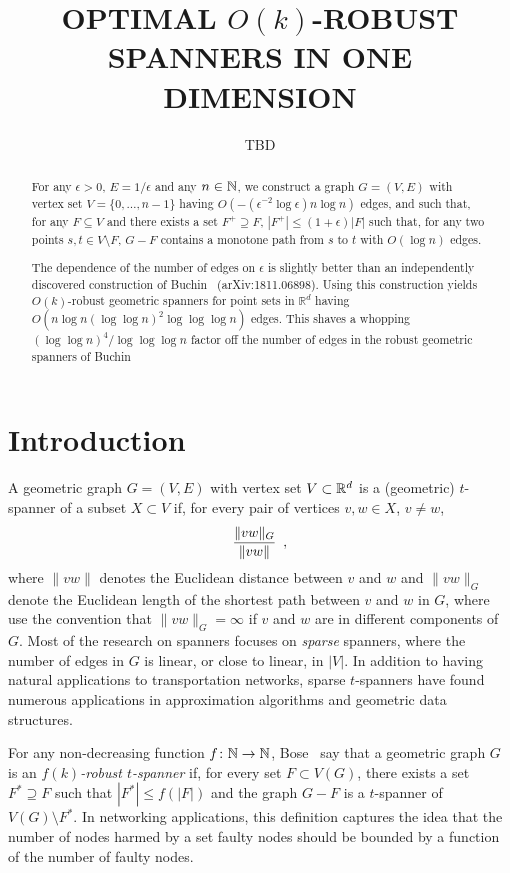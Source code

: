 \documentclass{patmorin}
\title{\MakeUppercase{Optimal} $O(k)$-\MakeUppercase{Robust Spanners in One Dimension}}
\author{TBD}
\begin{document}
\maketitle


\begin{abstract}
  For any $\epsilon >0$, $E=1/\epsilon$ and any $n\in\mathbb{N}$, we construct
  a graph $G=(V,E)$ with vertex set $V=\{0,\ldots,n-1\}$ having
  $O(-(\epsilon^{-2}\log\epsilon) n\log n)$ edges, and such that, for
  any $F\subseteq V$ and there exists a set $F^+\supseteq F$, $|F^+|\le
  (1+\epsilon)|F|$ such that, for any two points $s,t\in V\setminus F$,
  $G-F$ contains a monotone path from $s$ to $t$ with $O(\log n)$ edges.

  The dependence of the number of edges on $\epsilon$ is slightly
  better than an independently discovered construction of Buchin \etal\
  (arXiv:1811.06898). Using this construction yields $O(k)$-robust
  geometric spanners for point sets in $\mathbb{R}^d$ having $O(n\log
  n(\log\log n)^2\log\log\log n)$ edges. This shaves a whopping $(\log\log
  n)^4/\log\log\log n$ factor off the number of edges in the robust
  geometric spanners of Buchin \etal
\end{abstract}

\section{Introduction}

A geometric graph $G=(V,E)$ with vertex set $V\subset\mathbb{R}^d$ is a (geometric)
$t$-spanner of a subset $X\subset V$ if, for every pair of vertices
$v,w\in X$, $v\neq w$,
\begin{equation}
  \frac{\|vw\|_G}{\|vw\|} \enspace , \eqlabel{spanning-ratio}
\end{equation}
where $\|vw\|$ denotes the Euclidean distance between $v$ and $w$ and
$\|vw\|_G$ denote the Euclidean length of the shortest path between $v$
and $w$ in $G$, where use the convention that $\|vw\|_G=\infty$ if $v$
and $w$ are in different components of $G$.  
Most of the research on spanners focuses on \emph{sparse}
spanners, where the number of edges in $G$ is linear, or close to linear,
in $|V|$.  In addition to having natural applications to transportation
networks, sparse $t$-spanners have found numerous applications in
approximation algorithms and geometric data structures.

For any non-decreasing function $f\colon\mathbb{N}\to\mathbb{N}$, Bose \etal\ say
that a geometric graph $G$ is an \emph{$f(k)$-robust $t$-spanner}
if, for every set $F\subset V(G)$, there exists a set $F^*\supseteq
F$ such that $|F^*|\le f(|F|)$ and the graph $G-F$ is a $t$-spanner
of $V(G)\setminus F^*$.  In networking applications, this definition
captures the idea that the number of nodes harmed by a set faulty nodes
should be bounded by a function of the number of faulty nodes.
\end{document}

